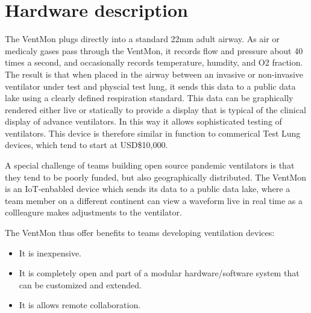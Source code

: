 \documentclass[11pt, letterpaper]{article}
\begin{document}
\section{Hardware description}


The VentMon plugs directly into a standard 22mm adult airway. As air or medicaly gases pass through the VentMon,
it records flow and pressure about 40 times a second, and occasionally records temperature, humdity, and O2 fraction.
The result is that when placed in the airway between an invasive or non-invasive ventilator under test and physcial test lung,
it sends this data to a public data lake \cite{VentDisplay} using a clearly defined respiration standard.
This data can be graphically rendered either live or statically to provide a display that is typical of the clinical display of advance ventilators.
In this way it allows sophisticated testing of ventilators.
This device is therefore similar in function to commerical Test Lung devices, which tend to start at USD\$10,000.

A special challenge of teams building open source pandemic ventilators is that they tend to be poorly funded,
but also geographically distributed. The VentMon is an IoT-enbabled device which sends its data to a public data lake,
where a team member on a different continent can view a waveform live in real time as a collleagure makes adjustments
to the ventilator.

The VentMon thus offer benefits to teams developing ventilation devices:
\begin{itemize}
\item It is inexpensive.
\item It is completely open and part of a modular hardware/software system that can be customized and extended.
\item It is allows remote collaboration.
\end{itemize}
\end{document}
